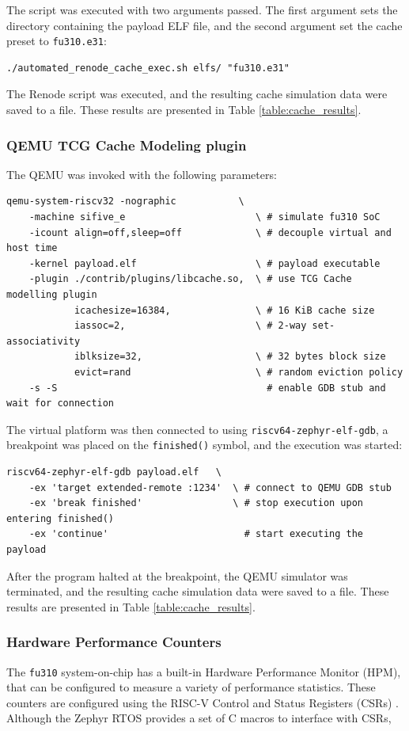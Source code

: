 \noindent The script was executed with two arguments passed. The first argument sets the directory containing the payload ELF file, and the second argument set the cache preset to \texttt{fu310.e31}:
\begin{verbatim}
./automated_renode_cache_exec.sh elfs/ "fu310.e31"
\end{verbatim}

\noindent The Renode script was executed, and the resulting cache simulation data were saved to a file. These results are presented in Table \ref{table:cache_results}.


\subsubsection{QEMU TCG Cache Modeling plugin}
The QEMU was invoked with the following parameters:
\begin{verbatim}
qemu-system-riscv32 -nographic           \
	-machine sifive_e                       \ # simulate fu310 SoC
	-icount align=off,sleep=off             \ # decouple virtual and host time
	-kernel payload.elf                     \ # payload executable
	-plugin ./contrib/plugins/libcache.so,  \ # use TCG Cache modelling plugin
	        icachesize=16384,               \ # 16 KiB cache size
	        iassoc=2,                       \ # 2-way set-associativity
	        iblksize=32,                    \ # 32 bytes block size
	        evict=rand                      \ # random eviction policy
	-s -S                                     # enable GDB stub and wait for connection
\end{verbatim}

\noindent The virtual platform was then connected to using \texttt{riscv64-zephyr-elf-gdb}, a breakpoint was placed on the \texttt{finished()} symbol, and the execution was started:
\begin{verbatim}
riscv64-zephyr-elf-gdb payload.elf   \
	-ex 'target extended-remote :1234'  \ # connect to QEMU GDB stub
	-ex 'break finished'                \ # stop execution upon entering finished()
	-ex 'continue'                        # start executing the payload
\end{verbatim}

\noindent After the program halted at the breakpoint, the QEMU simulator was terminated, and the resulting cache simulation data were saved to a file. These results are presented in %
Table \ref{table:cache_results}.


\subsubsection{Hardware Performance Counters}
The \texttt{fu310} system-on-chip has a built-in Hardware Performance Monitor (HPM), that can be configured to measure a variety of performance statistics. These counters are configured
using the RISC-V Control and Status Registers (CSRs) \cite{fe310docs, riscvisa}. Although the Zephyr RTOS provides a set of C macros to interface with CSRs, 


